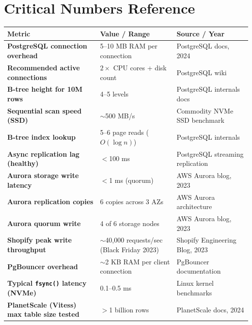 \documentclass[11pt,a4paper]{article}
\begin{document}
\newpage

\section{Critical Numbers Reference}

\begin{center}
\renewcommand{\arraystretch}{1.5}
\begin{tabularx}{\textwidth}{>{\bfseries}p{5cm} X p{3.5cm}}
\toprule
\textbf{Metric} & \textbf{Value / Range} & \textbf{Source / Year} \\
\midrule
PostgreSQL connection overhead & 5--10 MB RAM per connection & PostgreSQL docs, 2024 \\
\addlinespace
Recommended active connections & $2 \times$ CPU cores + disk count & PostgreSQL wiki \\
\addlinespace
B-tree height for 10M rows & 4--5 levels & PostgreSQL internals docs \\
\addlinespace
Sequential scan speed (SSD) & $\sim$500 MB/s & Commodity NVMe SSD benchmark \\
\addlinespace
B-tree index lookup & 5--6 page reads ($O(\log n)$) & PostgreSQL internals \\
\addlinespace
Async replication lag (healthy) & $<$100 ms & PostgreSQL streaming replication \\
\addlinespace
Aurora storage write latency & $<$1 ms (quorum) & AWS Aurora blog, 2023 \\
\addlinespace
Aurora replication copies & 6 copies across 3 AZs & AWS Aurora architecture \\
\addlinespace
Aurora quorum write & 4 of 6 storage nodes & AWS Aurora blog, 2023 \\
\addlinespace
Shopify peak write throughput & $\sim$40,000 requests/sec (Black Friday 2023) & Shopify Engineering Blog, 2023 \\
\addlinespace
PgBouncer overhead & $\sim$2 KB RAM per client connection & PgBouncer documentation \\
\addlinespace
Typical \texttt{fsync()} latency (NVMe) & 0.1--0.5 ms & Linux kernel benchmarks \\
\addlinespace
PlanetScale (Vitess) max table size tested & $>$1 billion rows & PlanetScale docs, 2024 \\
\bottomrule
\end{tabularx}
\end{center}
\end{document}
